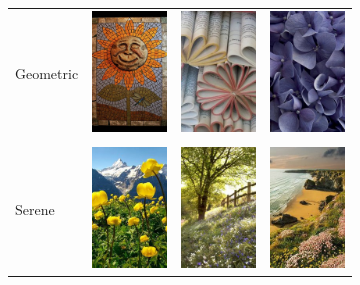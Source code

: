\begin{figure}
\begin{subfigure}[t]{0.48\linewidth}
\begin{tabular}{m{.02in}|m{\dgap} m{\dgap} m{\dgap}}
    \begin{turn}{90}\small{Geometric}\end{turn} &
    \includegraphics[width=.53in]{../style/figures/flickr_on_pinterest/flower/pred_style_Geometric_Composition/h/0.jpg} &
    \includegraphics[width=.53in]{../style/figures/flickr_on_pinterest/flower/pred_style_Geometric_Composition/h/1.jpg} &
    \includegraphics[width=.53in]{../style/figures/flickr_on_pinterest/flower/pred_style_Geometric_Composition/h/4.jpg} \\ \\
    \begin{turn}{90}\small{Serene}\end{turn} &
    \includegraphics[width=.53in]{../style/figures/flickr_on_pinterest/flower/pred_style_Serene/h/0.jpg} &
    \includegraphics[width=.53in]{../style/figures/flickr_on_pinterest/flower/pred_style_Serene/h/2.jpg} &
    \includegraphics[width=.53in]{../style/figures/flickr_on_pinterest/flower/pred_style_Serene/h/3.jpg} \\

\end{tabular}
\end{subfigure}
\end{figure}
